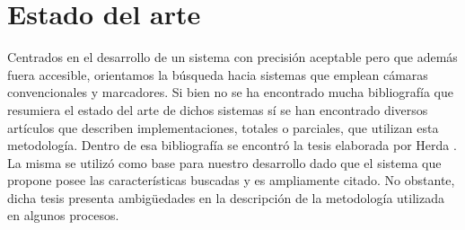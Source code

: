 \section{Estado del arte}\label{estadoDelArte}
Centrados en el desarrollo de un sistema con precisión aceptable pero que además fuera accesible, orientamos la búsqueda hacia sistemas que emplean cámaras convencionales y marcadores. Si bien no se ha encontrado mucha bibliografía que resumiera el estado del arte de dichos sistemas sí se han encontrado diversos artículos que describen implementaciones, totales o parciales, que utilizan esta metodología. Dentro de esa bibliografía se encontró la tesis elaborada por Herda  \cite{herda}. La misma se utilizó como base para nuestro desarrollo dado que el sistema que propone posee las características buscadas y es ampliamente citado. No obstante, dicha tesis presenta ambigüedades en la descripción de la metodología utilizada en algunos procesos.\\
